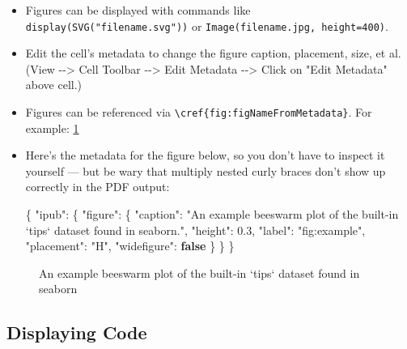 \documentclass[10pt,parskip=half,
	toc=sectionentrywithdots,
	bibliography=totocnumbered,
	captions=tableheading,
    numbers=noendperiod,
    headings=standardclasses]{scrartcl}
\newenvironment{Shaded}{}{}
\newcommand{\KeywordTok}[1]{\textcolor[rgb]{0.00,0.44,0.13}{\textbf{{#1}}}}
\newcommand{\DataTypeTok}[1]{\textcolor[rgb]{0.56,0.13,0.00}{{#1}}}
\newcommand{\FloatTok}[1]{\textcolor[rgb]{0.25,0.63,0.44}{{#1}}}
\newcommand{\StringTok}[1]{\textcolor[rgb]{0.25,0.44,0.63}{{#1}}}
\newcommand{\FunctionTok}[1]{\textcolor[rgb]{0.02,0.16,0.49}{{#1}}}
\begin{document}
\begin{itemize}
\item
  Figures can be displayed with commands like
  \texttt{display(SVG("filename.svg"))} or
  \texttt{Image(\textquotesingle{}filename.jpg\textquotesingle{},\ height=400)}.
\item
  Edit the cell's metadata to change the figure caption, placement,
  size, et al. (View -\/-\textgreater{} Cell Toolbar -\/-\textgreater{}
  Edit Metadata -\/-\textgreater{} Click on "Edit Metadata" above cell.)
\item
  Figures can be referenced via
  \texttt{\textbackslash{}cref\{fig:figNameFromMetadata\}}. For example:
  \cref{fig:example}
\item
  Here's the metadata for the figure below, so you don't have to inspect
  it yourself --- but be wary that multiply nested curly braces don't
  show up correctly in the PDF output:

\begin{Shaded}
\begin{Highlighting}[]
\FunctionTok{\{}
\DataTypeTok{"ipub"}\FunctionTok{:} \FunctionTok{\{}
    \DataTypeTok{"figure"}\FunctionTok{:} \FunctionTok{\{}
        \DataTypeTok{"caption"}\FunctionTok{:} \StringTok{"An example beeswarm plot of the built-in `tips` dataset found in seaborn."}\FunctionTok{,}
        \DataTypeTok{"height"}\FunctionTok{:} \FloatTok{0.3}\FunctionTok{,}
        \DataTypeTok{"label"}\FunctionTok{:} \StringTok{"fig:example"}\FunctionTok{,}
        \DataTypeTok{"placement"}\FunctionTok{:} \StringTok{"H"}\FunctionTok{,}
        \DataTypeTok{"widefigure"}\FunctionTok{:} \KeywordTok{false}
    \FunctionTok{\}}
\FunctionTok{\}}
\FunctionTok{\}}
\end{Highlighting}
\end{Shaded}
\end{itemize}

\begin{figure}[H]\begin{center}\end{center}\caption{An example beeswarm plot of the built-in `tips` dataset found in seaborn}\label{fig:example}
    \end{figure}

\subsection{Displaying Code}\label{displaying-code}
\end{document}
